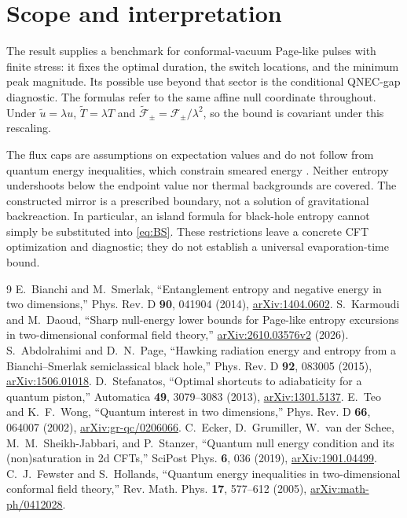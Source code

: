 \documentclass[10pt]{article}
\begin{document}
\section{Scope and interpretation}

The result supplies a benchmark for conformal-vacuum Page-like pulses with
finite stress: it fixes the optimal duration, the switch locations, and the
minimum peak magnitude. Its possible use beyond that sector is the conditional
QNEC-gap diagnostic. The formulas refer to the same affine null coordinate
throughout. Under $\widetilde u=\lambda u$,
$\widetilde T=\lambda T$ and $\widetilde{\mathcal F}_{\pm}=
\mathcal F_{\pm}/\lambda^2$, so the bound is covariant under this rescaling.

The flux caps are assumptions on expectation values and do not follow from
quantum energy inequalities, which constrain smeared energy \cite{FH}.
Neither entropy undershoots below the endpoint value nor thermal backgrounds
are covered. The constructed mirror is a prescribed boundary, not a solution
of gravitational backreaction. In particular, an island formula for black-hole
entropy cannot simply be substituted into \eqref{eq:BS}. These restrictions
leave a concrete CFT optimization and diagnostic; they do not establish a
universal evaporation-time bound.

\begin{thebibliography}{9}
 E.~Bianchi and M.~Smerlak,
``Entanglement entropy and negative energy in two dimensions,''
Phys. Rev. D \textbf{90}, 041904 (2014),
\href{https://arxiv.org/abs/1404.0602}{arXiv:1404.0602}.
 S.~Karmoudi and M.~Daoud,
``Sharp null-energy lower bounds for Page-like entropy excursions in
two-dimensional conformal field theory,''
\href{https://arxiv.org/abs/2610.03576v2}{arXiv:2610.03576v2} (2026).
 S.~Abdolrahimi and D.~N.~Page,
``Hawking radiation energy and entropy from a Bianchi--Smerlak semiclassical
black hole,'' Phys. Rev. D \textbf{92}, 083005 (2015),
\href{https://arxiv.org/abs/1506.01018}{arXiv:1506.01018}.
 D.~Stefanatos,
``Optimal shortcuts to adiabaticity for a quantum piston,''
Automatica \textbf{49}, 3079--3083 (2013),
\href{https://arxiv.org/abs/1301.5137}{arXiv:1301.5137}.
 E.~Teo and K.~F.~Wong,
``Quantum interest in two dimensions,'' Phys. Rev. D \textbf{66}, 064007 (2002),
\href{https://arxiv.org/abs/gr-qc/0206066}{arXiv:gr-qc/0206066}.
 C.~Ecker, D.~Grumiller, W.~van der Schee,
M.~M.~Sheikh-Jabbari, and P.~Stanzer,
``Quantum null energy condition and its (non)saturation in 2d CFTs,''
SciPost Phys. \textbf{6}, 036 (2019),
\href{https://arxiv.org/abs/1901.04499}{arXiv:1901.04499}.
 C.~J.~Fewster and S.~Hollands,
``Quantum energy inequalities in two-dimensional conformal field theory,''
Rev. Math. Phys. \textbf{17}, 577--612 (2005),
\href{https://arxiv.org/abs/math-ph/0412028}{arXiv:math-ph/0412028}.
\end{thebibliography}
\end{document}
